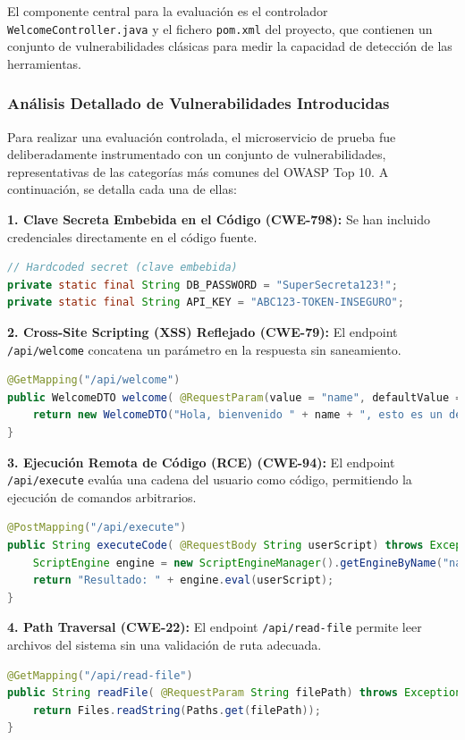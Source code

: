 El componente central para la evaluación es el controlador \texttt{WelcomeController.java} y el fichero \texttt{pom.xml} del proyecto, que contienen un conjunto de vulnerabilidades clásicas para medir la capacidad de detección de las herramientas.

\subsubsection{Análisis Detallado de Vulnerabilidades Introducidas}

Para realizar una evaluación controlada, el microservicio de prueba fue deliberadamente instrumentado con un conjunto de vulnerabilidades, representativas de las categorías más comunes del OWASP Top 10. A continuación, se detalla cada una de ellas:

\textbf{1. Clave Secreta Embebida en el Código (CWE-798):} Se han incluido credenciales directamente en el código fuente.
\begin{lstlisting}[language=java, caption={Claves secretas hardcodeadas.}]
// Hardcoded secret (clave embebida)
private static final String DB_PASSWORD = "SuperSecreta123!";
private static final String API_KEY = "ABC123-TOKEN-INSEGURO";
\end{lstlisting}

\textbf{2. Cross-Site Scripting (XSS) Reflejado (CWE-79):} El endpoint \texttt{/api/welcome} concatena un parámetro en la respuesta sin saneamiento.
\begin{lstlisting}[language=java, caption={Código vulnerable a XSS.}]
@GetMapping("/api/welcome")
public WelcomeDTO welcome( @RequestParam(value = "name", defaultValue = "...") String name) {
    return new WelcomeDTO("Hola, bienvenido " + name + ", esto es un demo");
}
\end{lstlisting}

\textbf{3. Ejecución Remota de Código (RCE) (CWE-94):} El endpoint \texttt{/api/execute} evalúa una cadena del usuario como código, permitiendo la ejecución de comandos arbitrarios.
\begin{lstlisting}[language=java, caption={Código vulnerable a RCE.}]
@PostMapping("/api/execute")
public String executeCode( @RequestBody String userScript) throws Exception {
    ScriptEngine engine = new ScriptEngineManager().getEngineByName("nashorn");
    return "Resultado: " + engine.eval(userScript);
}
\end{lstlisting}

\textbf{4. Path Traversal (CWE-22):} El endpoint \texttt{/api/read-file} permite leer archivos del sistema sin una validación de ruta adecuada.
\begin{lstlisting}[language=java, caption={Código vulnerable a Path Traversal.}]
@GetMapping("/api/read-file")
public String readFile( @RequestParam String filePath) throws Exception {
    return Files.readString(Paths.get(filePath));
}
\end{lstlisting}

